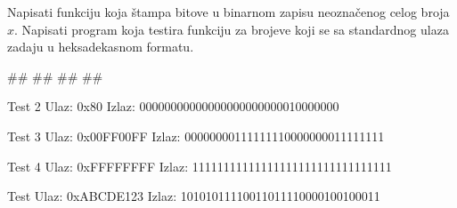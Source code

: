 \begin{Exercise}[label=201]
Napisati funkciju  koja štampa bitove u binarnom zapisu neoznačenog celog broja $x$. Napisati program koja testira funkciju  za brojeve koji se sa standardnog ulaza zadaju u heksadekasnom formatu.


\begin{miditest}
\begin{test}{1}
#\naslovUlaz#
##
#\naslovIzlaz#
##
\end{test}
\end{miditest}
\begin{miditest}
\begin{test}{Test 2}
Ulaz:   0x80
Izlaz:  00000000000000000000000010000000 
\end{test}
\end{miditest}

\begin{maxitest}
\begin{test}{Test 3}
Ulaz:   0x00FF00FF
Izlaz:  00000000111111110000000011111111
\end{test}
\end{maxitest}

\begin{maxitest}
\begin{test}{Test 4}
Ulaz:   0xFFFFFFFF
Izlaz:  11111111111111111111111111111111 
\end{test}
\end{maxitest}

\begin{maxitest}
\begin{test}{Test }
Ulaz:   0xABCDE123
Izlaz:  10101011110011011110000100100011
\end{test}
\end{maxitest}

\end{Exercise}
\begin{Answer}[ref=201]
\end{Answer}

